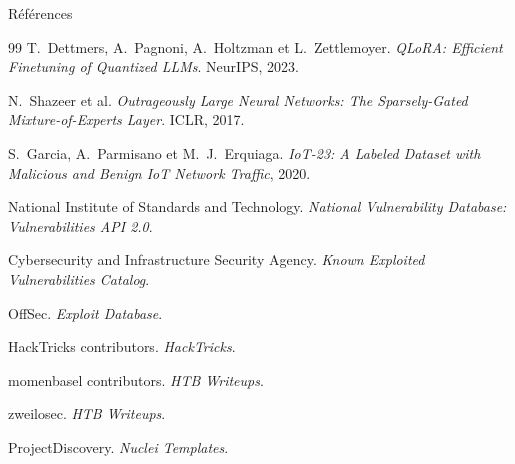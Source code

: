 \documentclass[aspectratio=169,10pt]{beamer}
\begin{document}
\begin{frame}[allowframebreaks]{Références}
  \scriptsize
  \begin{thebibliography}{99}
      T.~Dettmers, A.~Pagnoni, A.~Holtzman et L.~Zettlemoyer.
      \newblock \emph{QLoRA: Efficient Finetuning of Quantized LLMs}.
      \newblock NeurIPS, 2023.

      N.~Shazeer et al.
      \newblock \emph{Outrageously Large Neural Networks: The Sparsely-Gated
      Mixture-of-Experts Layer}.
      \newblock ICLR, 2017.

      S.~Garcia, A.~Parmisano et M.~J.~Erquiaga.
      \newblock \emph{IoT-23: A Labeled Dataset with Malicious and Benign IoT
      Network Traffic}, 2020.

      National Institute of Standards and Technology.
      \newblock \emph{National Vulnerability Database: Vulnerabilities API 2.0}.

      Cybersecurity and Infrastructure Security Agency.
      \newblock \emph{Known Exploited Vulnerabilities Catalog}.

      OffSec.
      \newblock \emph{Exploit Database}.

      HackTricks contributors.
      \newblock \emph{HackTricks}.

      momenbasel contributors.
      \newblock \emph{HTB Writeups}.

      zweilosec.
      \newblock \emph{HTB Writeups}.

      ProjectDiscovery.
      \newblock \emph{Nuclei Templates}.
  \end{thebibliography}
\end{frame}
\end{document}
